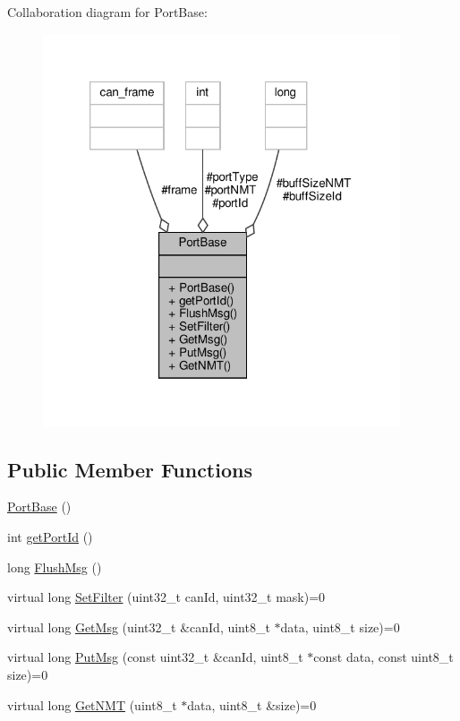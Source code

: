 Collaboration diagram for Port\+Base\+:\nopagebreak
\begin{figure}[H]
\begin{center}
\leavevmode
\includegraphics[width=299pt]{classPortBase__coll__graph}
\end{center}
\end{figure}
\subsection*{Public Member Functions}
\begin{DoxyCompactItemize}
\item 
\hyperlink{classPortBase_acb7872550bc94538ef95d2510d763be3}{Port\+Base} ()
\item 
int \hyperlink{classPortBase_a45ec4a2cd5e17e098f6f72677437f066}{get\+Port\+Id} ()
\item 
long \hyperlink{classPortBase_a913932fc850e9aebc947542773c669ad}{Flush\+Msg} ()
\item 
virtual long \hyperlink{classPortBase_a1d857a81a8e3f3bd460ef7c802ee762c}{Set\+Filter} (uint32\+\_\+t can\+Id, uint32\+\_\+t mask)=0
\item 
virtual long \hyperlink{classPortBase_a57e891d3992f70dea5c5e403350088be}{Get\+Msg} (uint32\+\_\+t \&can\+Id, uint8\+\_\+t $\ast$data, uint8\+\_\+t size)=0
\item 
virtual long \hyperlink{classPortBase_a26213ebb6ea0a0b77f60c28944e3bb8e}{Put\+Msg} (const uint32\+\_\+t \&can\+Id, uint8\+\_\+t $\ast$const data, const uint8\+\_\+t size)=0
\item 
virtual long \hyperlink{classPortBase_abab2bf17b01d87c2bca01cb2151aa2f1}{Get\+N\+MT} (uint8\+\_\+t $\ast$data, uint8\+\_\+t \&size)=0
\end{DoxyCompactItemize}
